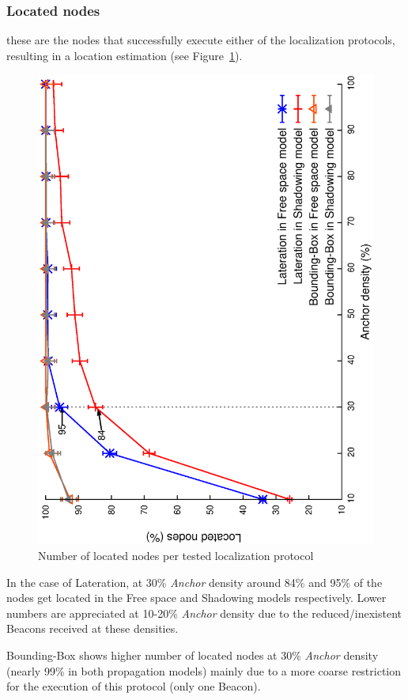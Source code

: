 
\subsubsection{Located nodes}
these are the nodes that successfully execute either of the localization protocols, resulting in a location estimation (see Figure~\ref{fig:locNodes}).

\begin{figure}[htbp]
  \centering
  \includegraphics[width=0.7\linewidth, angle = -90]{section4/figures/locatedNodes.eps}
  \caption{Number of located nodes per tested localization protocol
  \label{fig:locNodes}}
\end{figure}

In the case of Lateration, at 30\% \emph{Anchor} density around 84\% and 95\% of the nodes get located in the Free space and Shadowing models respectively. Lower numbers are appreciated at 10-20\% \emph{Anchor} density due to the reduced/inexistent Beacons received at these densities.

Bounding-Box shows higher number of located nodes at 30\% \emph{Anchor} density (nearly 99\% in both propagation models) mainly due to a more coarse restriction for the execution of this protocol (only one Beacon).

